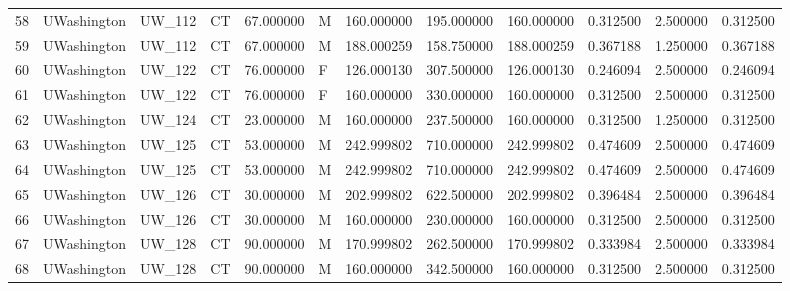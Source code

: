 \begin{tabular}{llllrlrrrrrr}
58     &     UWashington &       UW\_112 &                 CT &  67.000000 &        M &       160.000000 &    195.000000 &  160.000000 &               0.312500 &            2.500000 &          0.312500 \\
59     &     UWashington &       UW\_112 &                 CT &  67.000000 &        M &       188.000259 &    158.750000 &  188.000259 &               0.367188 &            1.250000 &          0.367188 \\
60     &     UWashington &       UW\_122 &                 CT &  76.000000 &        F &       126.000130 &    307.500000 &  126.000130 &               0.246094 &            2.500000 &          0.246094 \\
61     &     UWashington &       UW\_122 &                 CT &  76.000000 &        F &       160.000000 &    330.000000 &  160.000000 &               0.312500 &            2.500000 &          0.312500 \\
62     &     UWashington &       UW\_124 &                 CT &  23.000000 &        M &       160.000000 &    237.500000 &  160.000000 &               0.312500 &            1.250000 &          0.312500 \\
63     &     UWashington &       UW\_125 &                 CT &  53.000000 &        M &       242.999802 &    710.000000 &  242.999802 &               0.474609 &            2.500000 &          0.474609 \\
64     &     UWashington &       UW\_125 &                 CT &  53.000000 &        M &       242.999802 &    710.000000 &  242.999802 &               0.474609 &            2.500000 &          0.474609 \\
65     &     UWashington &       UW\_126 &                 CT &  30.000000 &        M &       202.999802 &    622.500000 &  202.999802 &               0.396484 &            2.500000 &          0.396484 \\
66     &     UWashington &       UW\_126 &                 CT &  30.000000 &        M &       160.000000 &    230.000000 &  160.000000 &               0.312500 &            2.500000 &          0.312500 \\
67     &     UWashington &       UW\_128 &                 CT &  90.000000 &        M &       170.999802 &    262.500000 &  170.999802 &               0.333984 &            2.500000 &          0.333984 \\
68     &     UWashington &       UW\_128 &                 CT &  90.000000 &        M &       160.000000 &    342.500000 &  160.000000 &               0.312500 &            2.500000 &          0.312500 \\

\end{tabular}
